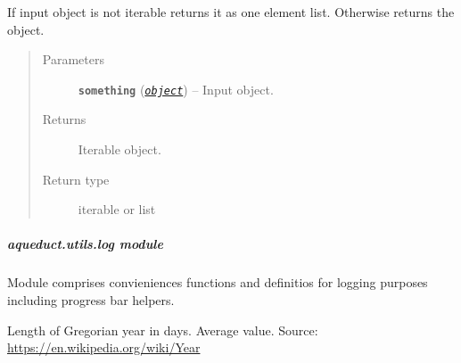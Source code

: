 \documentclass[a4paper,10pt,english]{sphinxmanual}
\begin{document}
\begin{fulllineitems}
\label{aqueduct.utils.helpers:aqueduct.utils.helpers.make_iterable}
If input object is not iterable returns it as one element list. Otherwise returns the object.
\begin{quote}\begin{description}
\item[{Parameters}] \leavevmode
\textbf{\texttt{something}} (\href{http://docs.python.org/2/library/functions.html\#object}{\emph{\texttt{object}}}) -- Input object.

\item[{Returns}] \leavevmode
Iterable object.

\item[{Return type}] \leavevmode
iterable or list

\end{description}\end{quote}

\end{fulllineitems}



\subparagraph{aqueduct.utils.log module}
\label{aqueduct.utils.log::doc}\label{aqueduct.utils.log:module-aqueduct.utils.log}\label{aqueduct.utils.log:aqueduct-utils-log-module}
Module comprises convieniences functions and definitios for logging
purposes including progress bar helpers.

\begin{fulllineitems}
\label{aqueduct.utils.log:aqueduct.utils.log.gregorian_year_in_days}
Length of Gregorian year in days. Average value. Source: \url{https://en.wikipedia.org/wiki/Year}

\end{fulllineitems}

\end{document}
